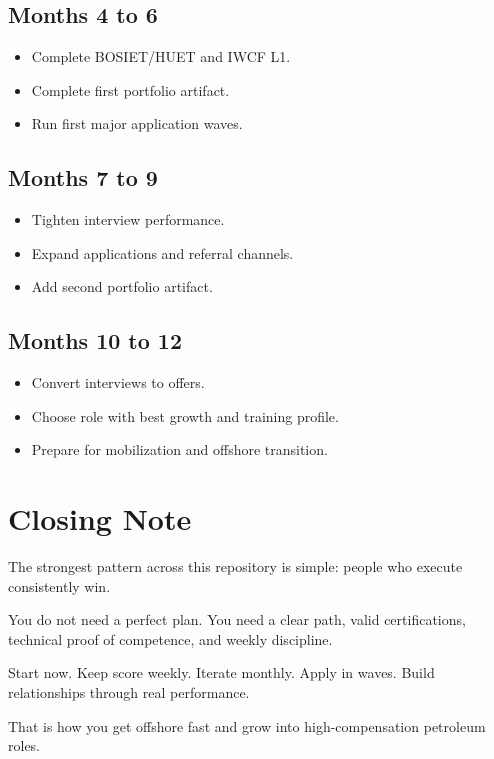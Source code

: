 \documentclass[11pt,openany]{book}
\begin{document}
\section{Months 4 to 6}
\begin{itemize}
  \item Complete BOSIET/HUET and IWCF L1.
  \item Complete first portfolio artifact.
  \item Run first major application waves.
\end{itemize}

\section{Months 7 to 9}
\begin{itemize}
  \item Tighten interview performance.
  \item Expand applications and referral channels.
  \item Add second portfolio artifact.
\end{itemize}

\section{Months 10 to 12}
\begin{itemize}
  \item Convert interviews to offers.
  \item Choose role with best growth and training profile.
  \item Prepare for mobilization and offshore transition.
\end{itemize}

\backmatter

\chapter*{Closing Note}
The strongest pattern across this repository is simple: people who execute consistently win.

You do not need a perfect plan. You need a clear path, valid certifications, technical proof of competence, and weekly discipline.

Start now. Keep score weekly. Iterate monthly. Apply in waves. Build relationships through real performance.

That is how you get offshore fast and grow into high-compensation petroleum roles.
\end{document}
